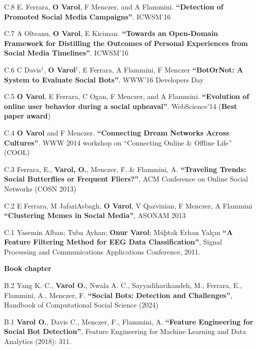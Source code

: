 \documentclass[10pt]{article}
\newenvironment{innerlist}[1][\enskip\textbullet]%
        {\begin{compactitem}[#1]}{\end{compactitem}}
\begin{document}
\begin{innerlist}
\item[C.8] E. Ferrara, \textbf{O Varol}, F Menczer, and A Flammini. \textbf{``Detection of Promoted Social Media Campaigns''}. ICWSM'16

\item[C.7] A Olteanu, \textbf{O Varol}, E Kiciman. \textbf{``Towards an Open-Domain Framework for Distilling the Outcomes of Personal Experiences from Social Media Timelines''}. ICWSM'16

\item[C.6] C Davis$^\dagger$, \textbf{O Varol}$^\dagger$, E Ferrara, A Flammini, F Menczer \textbf{``BotOrNot: A System to Evaluate Social Bots''}. WWW'16 Developers Day

\item[C.5] \textbf{O Varol}, E Ferrara, C Ogan, F Menczer, and A Flammini. \textbf{``Evolution of online user behavior during a social upheaval''}. WebScience'14 (\textbf{Best paper award}) %

\item[C.4] \textbf{O Varol} and F Menczer. \textbf{``Connecting Dream Networks Across Cultures''}. WWW 2014 workshop on ``Connecting Online \& Offline Life'' (COOL)

\item[C.3] Ferrara, E., \textbf{Varol, O.}, Menczer, F. \& Flammini, A. \textbf{``Traveling Trends: Social Butterflies or Frequent Fliers?''}, ACM Conference on Online Social Networks (COSN 2013) %

\item[C.2]  E Ferrara, M JafariAsbagh, \textbf{O Varol}, V Qazvinian, F Menczer, A Flammini \textbf{``Clustering Memes in Social Media''}, ASONAM 2013 %

\item[C.1] Yasemin Alban; Tuba Ayhan; \textbf{Onur Varol}; Müþtak Erhan Yal\c{c}{\i}n \textbf{``A Feature Filtering Method for EEG Data Classification''}, Signal Processing and Communications Applications Conference, 2011.
\end{innerlist}

\vspace{3mm}
\textbf{Book chapter}
\begin{innerlist}

\item[B.2] Yang K. C., \textbf{Varol O.}, Nwala A. C., Sayyadiharikandeh, M., Ferrara, E., Flammini, A., Menczer, F. \textbf{``Social Bots: Detection and Challenges''}, Handbook of Computational Social Science (2024)

\item[B.1] \textbf{Varol O.}, Davis C., Menczer, F., Flammini, A. \textbf{``Feature Engineering for Social Bot Detection''}, Feature Engineering for Machine Learning and Data Analytics (2018): 311.
\end{innerlist}
\end{document}
